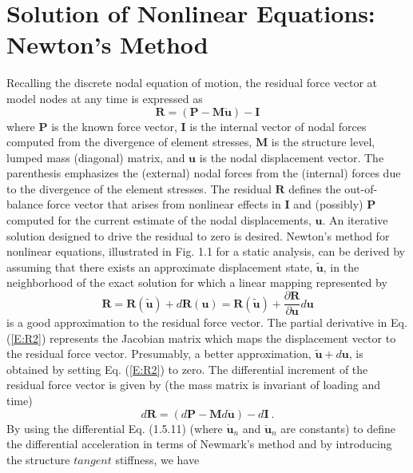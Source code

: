 \documentclass[11pt]{report}
\numberwithin{equation}{section}
\begin{document}
\section{Solution of Nonlinear Equations: Newton's Method}
\noindent 
Recalling the discrete nodal equation of motion, the residual force vector at model nodes
at any time is expressed as
%
\begin{equation}\label{E:R1}
\bm{R} = \left ( \bm{P}  - \mathbf{M} \ddot{\bm{u}} \right ) - \bm{I}
\end{equation}
%
\noindent where $\bm{P}$  is the known force vector,  $\bm{I}$ is the internal vector of 
nodal forces computed from the divergence of element stresses, $\mathbf{M}$ is the structure level,
lumped mass (diagonal) matrix, and
$\bm{u}$ is the nodal displacement vector.  The parenthesis emphasizes the 
(external) nodal forces from the (internal) forces due to the divergence of the element stresses.
The residual $\bm{R}$ defines the out-of-balance force vector 
that arises from nonlinear effects in $\bm{I}$ and (possibly) $\bm{P}$ computed for the 
current estimate of the nodal displacements, $\bm{u}$. An iterative solution designed to 
drive the residual to zero is desired. Newton's method for nonlinear equations, 
illustrated in Fig. 1.1 for a static analysis, can be derived by assuming that there 
exists an approximate displacement state, $\tilde{\bm{u}}$, in the neighborhood 
of the exact solution for which a linear mapping represented by
%
\begin{equation}\label{E:R2}
\bm{R} =\bm{R}(\tilde{\bm{u}})  + d\bm{R}(\bm{u}) =\bm{R}(\tilde{\bm{u}}) +
\frac{\partial \bm{R}}{\partial \bm{u}}  d\bm{u}
\end{equation}
%
\noindent 
is a good approximation to the residual force vector. The partial derivative in 
Eq. (\ref{E:R2}) represents the Jacobian matrix which maps the displacement 
vector to the residual force vector. Presumably, a better approximation, 
$\tilde{\bm{u}}+d\bm{u}$, is obtained by setting Eq. (\ref{E:R2}) to zero. 
The differential increment of the residual force vector is given by
(the mass matrix is invariant of loading and time)
%
\begin{equation}\label{E:R3}
d\bm{R} = \left ( d\bm{P}  - \mathbf{M} d\ddot{\bm{u}}\right ) - d \bm{I}\ .
\end{equation}
%
\noindent By using the differential Eq. (1.5.11)
(where $\dot{\bm{u}}_n$ and $\ddot{\bm{u}}_n$ are constants)
to define the differential acceleration in terms of 
Newmark's method and by introducing the structure $tangent$ stiffness, we have
\end{document}
